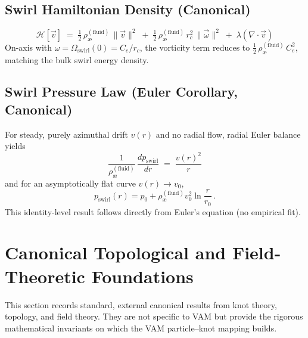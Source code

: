 \documentclass[11pt, a4paper]{article}
\begin{document}
\subsection{Swirl Hamiltonian Density (Canonical)}
\label{subsec:canon-hamiltonian}
\[
    \boxed{\, \mathcal{H}[\vec v] \;=\; \tfrac12\,\rho_{\text{\ae}}^{(\text{fluid})}\,\|\vec v\|^2
    \;+\; \tfrac12\,\rho_{\text{\ae}}^{(\text{fluid})}\,r_c^2\,\|\vec\omega\|^2
    \;+\; \lambda(\nabla\!\cdot\!\vec v) \,}
\]
On-axis with $\omega=\Omega_{\text{swirl}}(0)=C_e/r_c$, the vorticity term reduces to
$\tfrac12\,\rho_{\text{\ae}}^{(\text{fluid})}\,C_e^2$, matching the bulk swirl energy density. \cite{Batchelor1967,LandauLifshitz1987}

\subsection{Swirl Pressure Law (Euler Corollary, Canonical)}
\label{subsec:canon-darkpressure}
For steady, purely azimuthal drift $v(r)$ and no radial flow, radial Euler balance yields
\[
    \boxed{\, \frac{1}{\rho_{\text{\ae}}^{(\text{fluid})}}\,\frac{dp_{\text{swirl}}}{dr} \;=\; \frac{v(r)^2}{r} \,}
\]
and for an asymptotically flat curve $v(r)\to v_0$,
\[
    p_{\text{swirl}}(r) = p_0 + \rho_{\text{\ae}}^{(\text{fluid})} v_0^2 \ln\!\frac{r}{r_0}\,.
\]
This identity-level result follows directly from Euler’s equation (no empirical fit). \cite{Batchelor1967,LandauLifshitz1987}


\appendix

\section{Canonical Topological and Field-Theoretic Foundations}
\label{sec:topofields}

This section records standard, external canonical results from knot theory, topology, and field theory. They are not specific to VAM but provide the rigorous mathematical invariants on which the VAM particle–knot mapping builds.
\end{document}
